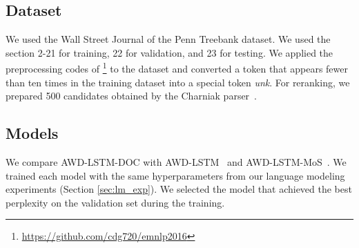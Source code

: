\documentclass[11pt,a4paper]{article}
\begin{document}
\subsection{Dataset}
We used the Wall Street Journal of the Penn Treebank dataset.
We used the section 2-21 for training, 22 for validation, and 23 for testing.
We applied the preprocessing codes of \footnote{\href{https://github.com/cdg720/emnlp2016}{https://github.com/cdg720/emnlp2016}} to the dataset and converted a token that appears fewer than ten times in the training dataset into a special token {\it unk}.
For reranking, we prepared 500 candidates obtained by the Charniak parser~\cite{A00-2018}.


\subsection{Models}
We compare AWD-LSTM-DOC with AWD-LSTM~\cite{merityRegOpt} and AWD-LSTM-MoS~\cite{DBLP:journals/corr/abs-1711-03953}.
We trained each model with the same hyperparameters from our language modeling experiments (Section \ref{sec:lm_exp}).
We selected the model that achieved the best perplexity on the validation set during the training.
\end{document}
